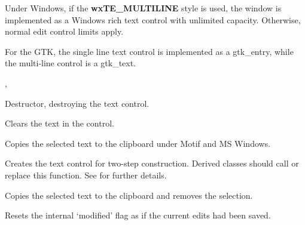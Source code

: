 Under Windows, if the {\bf wxTE\_MULTILINE} style is used, the window is implemented
as a Windows rich text control with unlimited capacity. Otherwise, normal edit control limits
apply.

For the GTK, the single line text control is implemented as a gtk\_entry, 
while the multi-line control is a gtk\_text.


, 



Destructor, destroying the text control.

\label{wxtextctrlclear}


Clears the text in the control.

\label{wxtextctrlcopy}


Copies the selected text to the clipboard under Motif and MS Windows.

\label{wxtextctrlcreate}


Creates the text control for two-step construction. Derived classes
should call or replace this function. See \rtfsp
for further details.

\label{wxtextctrlcut}


Copies the selected text to the clipboard and removes the selection.



Resets the internal `modified' flag as if the current edits had been saved.

\label{wxtextctrlgetinsertionpoint}

